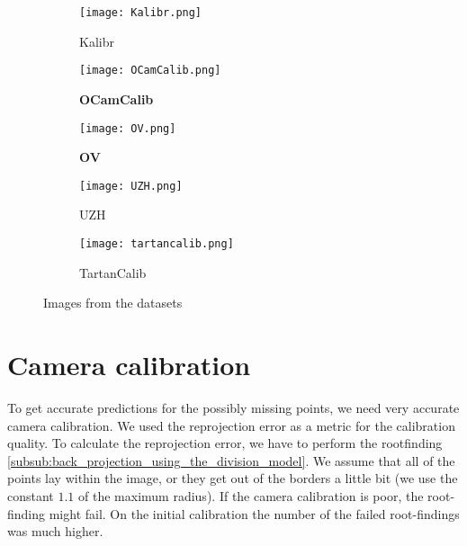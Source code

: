 \begin{figure}[h]
	\centering
	\begin{subfigure}[b]{0.3\linewidth}
		\texttt{[image: Kalibr.png]}
		\caption{Kalibr}
	\end{subfigure}
	\hfill
	\begin{subfigure}[b]{0.3\linewidth}
		\texttt{[image: OCamCalib.png]}
		\caption{\textbf{OCamCalib}}
	\end{subfigure}
	\hfill
	\begin{subfigure}[b]{0.3\linewidth}
		\texttt{[image: OV.png]}
		\caption{\textbf{OV}}
	\end{subfigure}
	\begin{subfigure}[b]{0.3\linewidth}
		\texttt{[image: UZH.png]}
		\caption{UZH}
	\end{subfigure}
	\begin{subfigure}[b]{0.3\linewidth}
		\texttt{[image: tartancalib.png]}
		\caption{TartanCalib}
	\end{subfigure}
	\caption{Images from the datasets}
\end{figure}

\section{Camera calibration}\label{sec:camera_calibration}

\begin{minipage}{0.5\linewidth}
	To get accurate predictions for the possibly missing points, we need
	very accurate camera calibration. We used the reprojection error as a metric
	for the calibration quality.
	To calculate the reprojection error, we have to perform the
	rootfinding \cref{subsub:back_projection_using_the_division_model}. We assume
	that all of the points lay within the image, or they get out of the borders
	a little bit (we use the constant \(1.1\) of the maximum radius). If the
	camera calibration is poor, the root-finding might fail. On the initial
	calibration the number of the failed root-findings was much higher.
\end{minipage}
\hfill
\begin{minipage}{0.4\linewidth}
	\captionsetup{width=.9\linewidth}
	\captionsetup{width=.9\linewidth}
\end{minipage}

